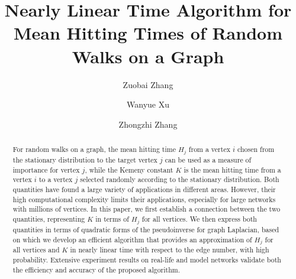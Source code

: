 \documentclass[sigconf]{acmart}
\begin{document}
\fancyhead{}
\title{Nearly Linear Time Algorithm for Mean Hitting Times of Random Walks on a Graph}


\author{Zuobai Zhang}

\author{Wanyue Xu}

\author{Zhongzhi Zhang}

%
\renewcommand{\shortauthors}{Z. Zhang, W. Xu, and Z. Zhang.}

\begin{abstract}
	For random walks on a graph, the mean hitting time $H_j$ from a vertex $i$ chosen from the stationary distribution to the target vertex $j$ can be used as a measure of importance for vertex  $j$, while the Kemeny constant $K$ is the mean hitting time from a vertex $i$ to a vertex $j$ selected randomly according to the stationary distribution. Both quantities have found a large variety of applications in different areas. However, their high computational complexity limits their applications, especially for large networks with millions of vertices. In this paper, we first establish a connection between the two quantities, representing $K$ in terms of $H_j$ for all vertices. We then express both quantities in terms of quadratic forms of the pseudoinverse for graph Laplacian, based on which we develop an efficient algorithm that provides an approximation of $H_j$ for all vertices and $K$ in nearly linear time with respect to  the edge number, with  high probability. Extensive experiment results on real-life and model networks validate both the efficiency and accuracy of the proposed algorithm.
\end{abstract}
\end{document}

